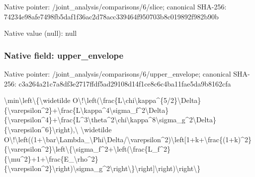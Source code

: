 \documentclass[10pt,a4paper]{article}
\begin{document}
Native pointer: /joint\_analysis/comparisons/6/slice; canonical SHA-256: 74234e98afe7498fb5daf1f3\allowbreak{}6ac2d78acc339464f950703b\allowbreak{}8c019892f982b90b



Native value (null): null



\subsubsection{Native field: upper\_envelope}


Native pointer: /joint\_analysis/comparis\allowbreak{}ons/6/upper\_envelope; canonical SHA-256: c3a264a21c7a8df3e2717ffd\allowbreak{}f5ad29108d14f1ce8c6c4ba1\allowbreak{}1fae5da9b8162cfa


\textbackslash{}min\textbackslash{}left\textbackslash{}\{\textbackslash{}widetilde O\textbackslash{}!\textbackslash{}left(\textbackslash{}frac\{L\textbackslash{}chi\textbackslash{}kap\allowbreak{}pa\textasciicircum{}\{5/2\}\textbackslash{}Delta\}\{\textbackslash{}varepsi\allowbreak{}lon\textasciicircum{}2\}+\textbackslash{}frac\{L\textbackslash{}kappa\textasciicircum{}4\textbackslash{}s\allowbreak{}igma\_f\textasciicircum{}2\textbackslash{}Delta\}\{\textbackslash{}varepsi\allowbreak{}lon\textasciicircum{}4\}+\textbackslash{}frac\{L\textasciicircum{}3\textbackslash{}theta\textasciicircum{}2\allowbreak{}\textbackslash{}chi\textbackslash{}kappa\textasciicircum{}8\textbackslash{}sigma\_g\textasciicircum{}2\textbackslash{}D\allowbreak{}elta\}\{\textbackslash{}varepsilon\textasciicircum{}6\}\textbackslash{}rig\allowbreak{}ht),\textbackslash{} \textbackslash{}widetilde O\textbackslash{}!\textbackslash{}left((1+\textbackslash{}bar\textbackslash{}Lambda\_\allowbreak{}\textbackslash{}Phi\textbackslash{}Delta/\textbackslash{}varepsilon\textasciicircum{}2\allowbreak{})\textbackslash{}left[1+k+\textbackslash{}frac\{(1+k)\textasciicircum{}2\allowbreak{}\}\{\textbackslash{}varepsilon\textasciicircum{}2\}\textbackslash{}left\textbackslash{}\{\textbackslash{}\allowbreak{}sigma\_f\textasciicircum{}2+\textbackslash{}left(\textbackslash{}frac\{L\_\allowbreak{}f\textasciicircum{}2\}\{\textbackslash{}mu\textasciicircum{}2\}+1+\textbackslash{}frac\{E\_\textbackslash{}r\allowbreak{}ho\textasciicircum{}2\}\{\textbackslash{}varepsilon\textasciicircum{}2\}\textbackslash{}rig\allowbreak{}ht)\textbackslash{}sigma\_g\textasciicircum{}2\textbackslash{}right\textbackslash{}\}\textbackslash{}ri\allowbreak{}ght]\textbackslash{}right)\textbackslash{}right\textbackslash{}\}
\end{document}
